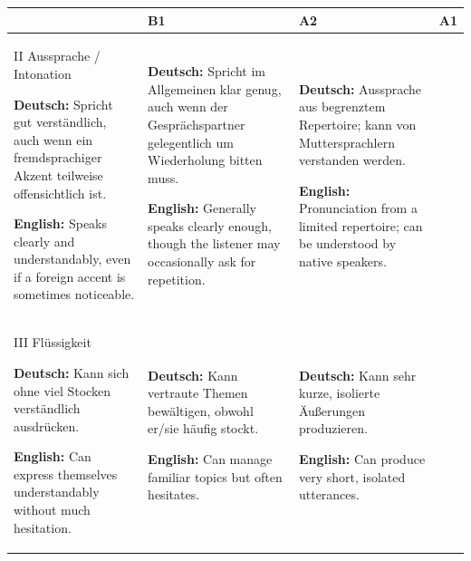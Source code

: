 \documentclass[a4paper]{article}
\begin{document}
            \begin{table}[H]
                \centering
                \begin{tabular}{|p{3cm}|p{4cm}|p{4cm}|p{4cm}|}
                    \hline
                    & B1 & A2 & A1 \\
                    \hline
                    
                    II Aussprache / Intonation
                    
                    \textbf{Deutsch:} Spricht gut verständlich, auch wenn ein fremdsprachiger Akzent teilweise offensichtlich ist.
                    
                    \textbf{English:} Speaks clearly and understandably, even if a foreign accent is sometimes noticeable.
                    &
                    \textbf{Deutsch:} Spricht im Allgemeinen klar genug, auch wenn der Gesprächspartner gelegentlich um Wiederholung bitten muss.
                    
                    \textbf{English:} Generally speaks clearly enough, though the listener may occasionally ask for repetition.
                    &
                    \textbf{Deutsch:} Aussprache aus begrenztem Repertoire; kann von Muttersprachlern verstanden werden.
                    
                    \textbf{English:} Pronunciation from a limited repertoire; can be understood by native speakers.
                    \\
                    \hline
                    
                    III Flüssigkeit
                    
                    \textbf{Deutsch:} Kann sich ohne viel Stocken verständlich ausdrücken.
                    
                    \textbf{English:} Can express themselves understandably without much hesitation.
                    &
                    \textbf{Deutsch:} Kann vertraute Themen bewältigen, obwohl er/sie häufig stockt.
                    
                    \textbf{English:} Can manage familiar topics but often hesitates.
                    &
                    \textbf{Deutsch:} Kann sehr kurze, isolierte Äußerungen produzieren.
                    
                    \textbf{English:} Can produce very short, isolated utterances.
                    \\
                    \hline
                    

\end{tabular}
\end{table}
\end{document}
